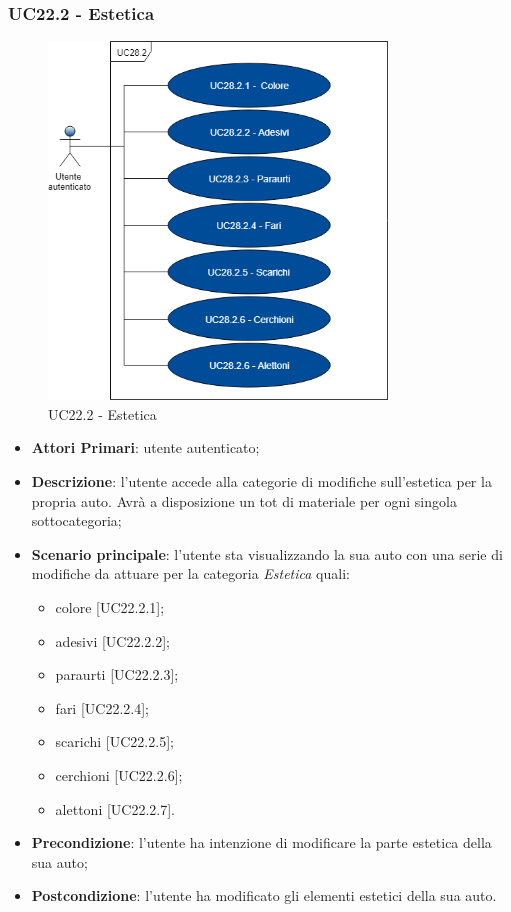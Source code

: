 \subsubsection{UC22.2 - Estetica}
\begin{figure}[h]
	\includegraphics[width=9cm]{res/images/UC26-2Estetica.png}
	\centering
	\caption{UC22.2 - Estetica}
\end{figure}
\begin{itemize}
	\item \textbf{Attori Primari}: utente autenticato;
	\item \textbf{Descrizione}: l'utente accede alla categorie di modifiche sull'estetica per la propria auto. Avrà a disposizione un tot di materiale per ogni singola sottocategoria;
	\item \textbf{Scenario principale}: l'utente sta visualizzando la sua auto con una serie di modifiche da attuare per la categoria \textit{Estetica} quali:
	\begin{itemize}
		\item colore [UC22.2.1];
		\item adesivi [UC22.2.2];
		\item paraurti [UC22.2.3];
		\item fari [UC22.2.4];
		\item scarichi [UC22.2.5];
		\item cerchioni [UC22.2.6];
		\item alettoni [UC22.2.7].
	\end{itemize}
	\item \textbf{Precondizione}: l'utente ha intenzione di modificare la parte estetica della sua auto;
	\item \textbf{Postcondizione}: l'utente ha modificato gli elementi estetici della sua auto.
\end{itemize}

